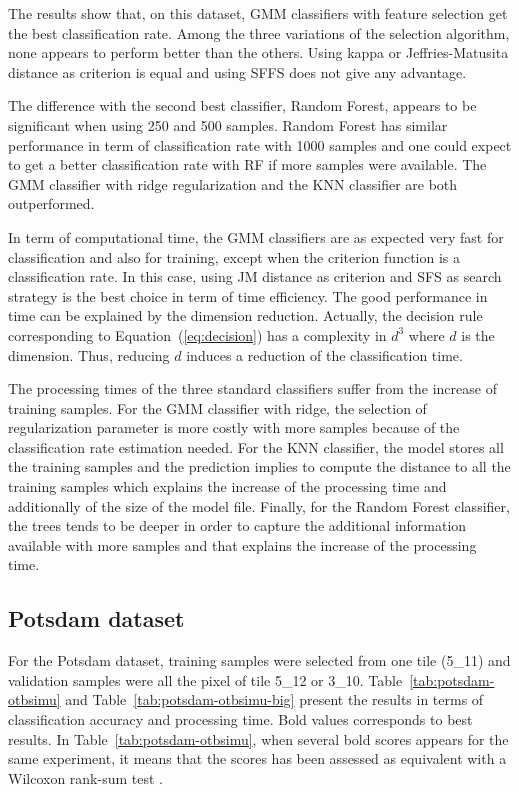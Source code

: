 \documentclass[journal,peerreview,onecolumn]{IEEEtran}
\begin{document}
    The results show that, on this  dataset, GMM classifiers with feature selection get the best classification rate. Among the three variations of the selection algorithm, none appears to perform better than the others. Using kappa or Jeffries-Matusita distance as criterion is equal and using SFFS does not give any advantage.

    The difference with the second best classifier, Random Forest, appears to be significant when using 250 and 500 samples. Random Forest has similar performance in term of classification rate with 1000 samples and one could expect to get a better classification rate with RF if more samples were available. The GMM classifier with ridge regularization and the KNN classifier are both outperformed.

    In term of computational time, the GMM classifiers are as expected very fast for classification and also for training, except when the criterion function is a classification rate. In this case, using JM distance as criterion and SFS as search strategy is the best choice in term of time efficiency. The good performance in time can be explained by the dimension reduction. Actually, the decision rule corresponding to Equation~(\ref{eq:decision}) has a complexity in $d^3$ where $d$ is the dimension. Thus, reducing $d$ induces a reduction of the classification time.

    The processing times of the three standard classifiers suffer from the increase of training samples. For the GMM classifier with ridge, the selection of regularization parameter is more costly with more samples because of the classification rate estimation needed. For the KNN classifier, the model stores all the training samples and the prediction implies to compute the distance to all the training samples which explains the increase of the processing time and additionally of the size of the model file. Finally, for the Random Forest classifier, the trees tends to be deeper in order to capture the additional information available with more samples and that explains the increase of the processing time.

    \subsection{Potsdam dataset}

    For the Potsdam  dataset, training samples were  selected from one
    tile (5\_11)  and validation  samples were all  the pixel  of tile
    5\_12     or    3\_10.      Table~\ref{tab:potsdam-otbsimu}    and
    Table~\ref{tab:potsdam-otbsimu-big} present  the results  in terms
    of classification accuracy and processing time. Bold values corresponds to best results. In Table~\ref{tab:potsdam-otbsimu}, when several bold scores appears for the same experiment, it means that the scores has been assessed as equivalent with a Wilcoxon rank-sum test \cite{mann1947test}.
\end{document}

